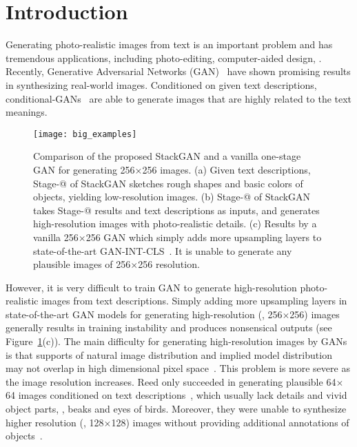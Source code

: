 \documentclass[10pt,twocolumn,letterpaper]{article}
\makeatletter
\newcommand{\Rmnum}[1]{\expandafter\@slowromancap\romannumeral #1@}
\makeatother
\begin{document}
\vspace{-8pt}
\section{Introduction}
\vspace{-5pt}

Generating photo-realistic images from text is an important problem and has tremendous applications, including photo-editing, computer-aided design, \etc. Recently, Generative Adversarial Networks (GAN)~\cite{goodfellow2014generative, DentonCSF15, Radford15} have shown promising results in synthesizing real-world images. Conditioned on given text descriptions, conditional-GANs~\cite{reed2016generative, reed2016learning} are able to generate images that are highly related to the text meanings.



\begin{figure}[bt]
\begin{center}
	\texttt{[image: big\_examples]}
\end{center}
\vspace{-8pt}
   \caption{
    Comparison of the proposed StackGAN and a vanilla one-stage GAN for generating 256$\times$256 images.    (a) Given text descriptions, Stage-\Rmnum{1} of StackGAN sketches rough shapes and basic colors of objects, yielding low-resolution images.    (b) Stage-\Rmnum{2} of StackGAN takes Stage-\Rmnum{1} results and text descriptions as inputs, and generates high-resolution images with photo-realistic details.    (c) Results by a vanilla 256$\times$256 GAN which simply adds more upsampling layers to state-of-the-art GAN-INT-CLS~\cite{reed2016generative}. It is unable to generate any plausible images of 256$\times$256 resolution.}
    \label{fig:big_examples}
\vspace{-8pt}
\end{figure}


However, it is very difficult to train GAN to generate high-resolution photo-realistic images from text descriptions. Simply adding more upsampling layers in state-of-the-art GAN models for generating high-resolution (\eg, 256$\times$256) images generally results in training instability and produces nonsensical outputs (see Figure~\ref{fig:big_examples}(c)). The main difficulty for generating high-resolution images by GANs is that supports of natural image distribution and implied model distribution may not overlap in high dimensional pixel space~\cite{Casper2016, ArjovskyB17}. This problem is more severe as the image resolution increases. Reed \etal only succeeded in generating plausible 64$\times$64 images conditioned on text descriptions~\cite{reed2016generative}, which usually lack details and vivid object parts, \eg, beaks and eyes of birds. Moreover, they were unable to synthesize higher resolution (\eg, 128$\times$128) images without providing additional annotations of objects~\cite{reed2016learning}.
\end{document}
